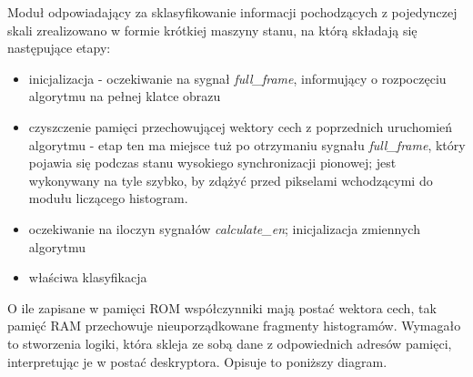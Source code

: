 Moduł odpowiadający za sklasyfikowanie informacji pochodzących z pojedynczej skali zrealizowano w formie krótkiej maszyny stanu, na którą składają się następujące etapy:
\begin{itemize}
	\item inicjalizacja - oczekiwanie na sygnał \textit{full\_frame}, informujący o rozpoczęciu algorytmu na pełnej klatce obrazu
	\item czyszczenie pamięci przechowującej wektory cech z poprzednich uruchomień algorytmu - etap ten ma miejsce tuż po otrzymaniu sygnału \textit{full\_frame}, który pojawia się podczas stanu wysokiego synchronizacji pionowej; jest wykonywany na tyle szybko, by zdążyć przed pikselami wchodzącymi do modułu liczącego histogram.
	\item oczekiwanie na iloczyn sygnałów \textit{calculate\_en}; inicjalizacja zmiennych algorytmu
	\item właściwa klasyfikacja
\end{itemize}

O ile zapisane w pamięci ROM współczynniki mają postać wektora cech, tak pamięć RAM przechowuje nieuporządkowane fragmenty histogramów. Wymagało to stworzenia logiki, która skleja ze sobą dane z odpowiednich adresów pamięci, interpretując je w postać deskryptora. Opisuje to poniższy diagram.

